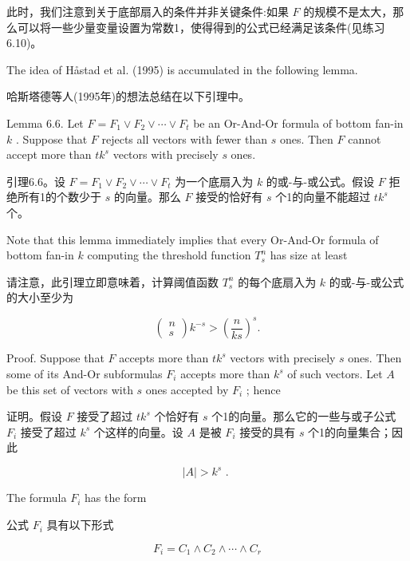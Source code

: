 \documentclass[10pt]{article}
\begin{document}
\begin{tcolorbox}\relax
此时，我们注意到关于底部扇入的条件并非关键条件:如果 \(F\) 的规模不是太大，那么可以将一些少量变量设置为常数1，使得得到的公式已经满足该条件(见练习6.10)。
\end{tcolorbox}

The idea of Håstad et al. (1995) is accumulated in the following lemma.

\begin{tcolorbox}\relax
哈斯塔德等人(1995年)的想法总结在以下引理中。
\end{tcolorbox}

Lemma 6.6. Let \(F = {F}_{1} \vee  {F}_{2} \vee  \cdots  \vee  {F}_{t}\) be an Or-And-Or formula of bottom fan-in \(k\) . Suppose that \(F\) rejects all vectors with fewer than \(s\) ones. Then \(F\) cannot accept more than \(t{k}^{s}\) vectors with precisely \(s\) ones.

\begin{tcolorbox}\relax
引理6.6。设 \(F = {F}_{1} \vee  {F}_{2} \vee  \cdots  \vee  {F}_{t}\) 为一个底扇入为 \(k\) 的或-与-或公式。假设 \(F\) 拒绝所有1的个数少于 \(s\) 的向量。那么 \(F\) 接受的恰好有 \(s\) 个1的向量不能超过 \(t{k}^{s}\) 个。
\end{tcolorbox}

Note that this lemma immediately implies that every Or-And-Or formula of bottom fan-in \(k\) computing the threshold function \({T}_{s}^{n}\) has size at least

\begin{tcolorbox}\relax
请注意，此引理立即意味着，计算阈值函数 \({T}_{s}^{n}\) 的每个底扇入为 \(k\) 的或-与-或公式的大小至少为
\end{tcolorbox}

\[
\left( \begin{array}{l} n \\  s \end{array}\right) {k}^{-s} > {\left( \frac{n}{ks}\right) }^{s}.
\]

Proof. Suppose that \(F\) accepts more than \(t{k}^{s}\) vectors with precisely \(s\) ones. Then some of its And-Or subformulas \({F}_{i}\) accepts more than \({k}^{s}\) of such vectors. Let \(A\) be this set of vectors with \(s\) ones accepted by \({F}_{i}\) ; hence

\begin{tcolorbox}\relax
证明。假设 \(F\) 接受了超过 \(t{k}^{s}\) 个恰好有 \(s\) 个1的向量。那么它的一些与或子公式 \({F}_{i}\) 接受了超过 \({k}^{s}\) 个这样的向量。设 \(A\) 是被 \({F}_{i}\) 接受的具有 \(s\) 个1的向量集合；因此
\end{tcolorbox}

\[
\left| A\right|  > {k}^{s}\text{ . }
\]

The formula \({F}_{i}\) has the form

\begin{tcolorbox}\relax
公式 \({F}_{i}\) 具有以下形式
\end{tcolorbox}

\[
{F}_{i} = {C}_{1} \land  {C}_{2} \land  \cdots  \land  {C}_{r}
\]
\end{document}
